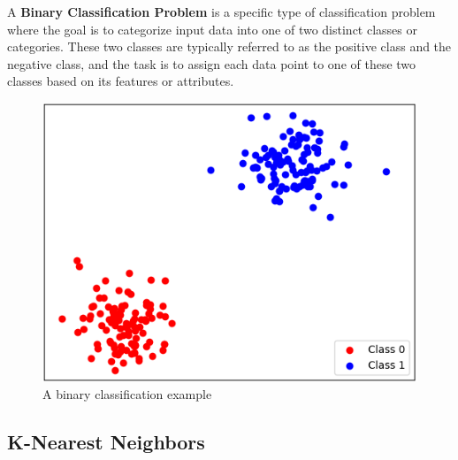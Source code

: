 A \textbf{Binary Classification Problem} is a specific type of classification problem where the goal is to categorize input data into one of two distinct classes or categories. 
These two classes are typically referred to as the positive class and the negative class, and the task is to assign each data point to one of these two classes based on its features or attributes.
\begin{figure}[H]
  \centering
  \includegraphics[width=0.7\linewidth]{graphics/BinaryClassification.png}
  \caption{A binary classification example}
  \label{fig:bin_classification}
\end{figure}

\subsection{K-Nearest Neighbors}
\label{subsec:KNN}


